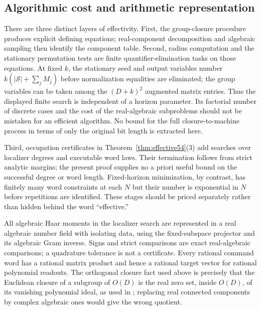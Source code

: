 \subsection{Algorithmic cost and arithmetic representation}
There are three distinct layers of effectivity. First, the group-closure procedure produces explicit defining equations; real-component decomposition and algebraic sampling then identify the component table. Second, radius computation and the stationary permutation tests are finite quantifier-elimination tasks on those equations. At fixed $k$, the stationary seed and output variables number $k(|\mathcal S|+\sum_jM_j)$ before normalization equalities are eliminated; the group variables can be taken among the $(D+k)^2$ augmented matrix entries. Thus the displayed finite search is independent of a horizon parameter. Its factorial number of discrete cases and the cost of the real-algebraic subproblems should not be mistaken for an efficient algorithm. No bound for the full closure-to-machine process in terms of only the original bit length is extracted here.

Third, occupation certificates in Theorem~\ref{thm:effective54}(3) add searches over localizer degrees and executable word laws. Their termination follows from strict analytic margins; the present proof supplies no a priori useful bound on the successful degree or word length. Fixed-horizon minimization, by contrast, has finitely many word constraints at each $N$ but their number is exponential in $N$ before repetitions are identified. These stages should be priced separately rather than hidden behind the word ``effective.''

All algebraic Haar moments in the localizer search are represented in a real algebraic number field with isolating data, using the fixed-subspace projector and its algebraic Gram inverse. Signs and strict comparisons are exact real-algebraic comparisons; a quadrature tolerance is not a certificate. Every rational command word has a rational matrix product and hence a rational target vector for rational polynomial readouts. The orthogonal closure fact used above is precisely that the Euclidean closure of a subgroup of $O(D)$ is the real zero set, inside $O(D)$, of its vanishing polynomial ideal, as used in \cite{BJKP}; replacing real connected components by complex algebraic ones would give the wrong quotient.
